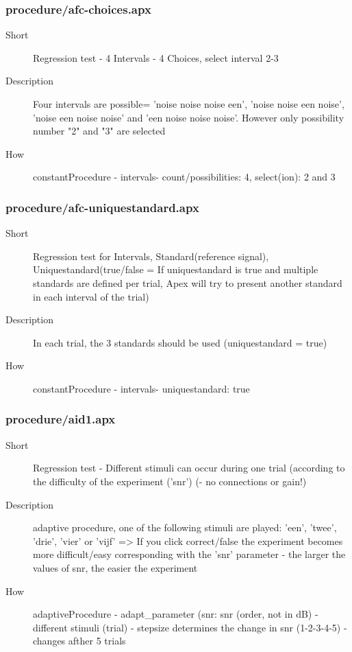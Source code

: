 \subsubsection{procedure/afc-choices.apx}
\begin{description}
\item[Short] 
 Regression test - 4 Intervals - 4 Choices, select interval 2-3
\item[Description] 
 Four intervals are possible= 'noise noise noise een', 'noise noise een noise', 'noise een noise noise' and 'een noise noise noise'. However only possibility number "2" and "3" are selected
\item[How] 
 constantProcedure - intervals- count/possibilities: 4, select(ion): 2 and 3
\end{description}

\subsubsection{procedure/afc-uniquestandard.apx}
\begin{description}
\item[Short] 
 Regression test for Intervals, Standard(reference signal), Uniquestandard(true/false = If uniquestandard is true and multiple standards are defined per trial, Apex will try to present another standard in each interval of the trial)
\item[Description] 
 In each trial, the 3 standards should be used (uniquestandard = true)
\item[How] 
 constantProcedure - intervals- uniquestandard: true
\end{description}

\subsubsection{procedure/aid1.apx}
\begin{description}
\item[Short] 
 Regression test - Different stimuli can occur during one trial (according to the difficulty of the experiment ('snr') (- no connections or gain!)
\item[Description] 
 adaptive procedure, one of the following stimuli are played: 'een', 'twee', 'drie', 'vier' or 'vijf' =\textgreater{} If you click correct/false the experiment becomes more difficult/easy corresponding with the 'snr' parameter - the larger the values of snr, the easier the experiment
\item[How] 
 adaptiveProcedure - adapt\_parameter (snr: snr (order, not in dB) - different stimuli (trial) - stepsize determines the change in snr (1-2-3-4-5) - changes afther 5 trials
\end{description}

